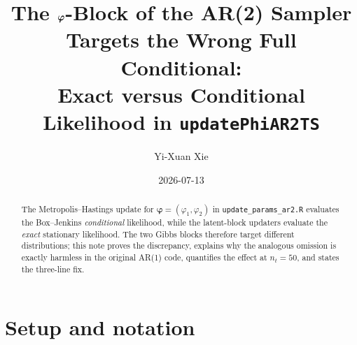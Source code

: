 \documentclass[11pt]{article}
\title{The $\bphi$-Block of the AR(2) Sampler Targets the Wrong Full
       Conditional:\\ Exact versus Conditional Likelihood in
       \texttt{updatePhiAR2TS}}
\author{Yi-Xuan Xie}
\date{2026-07-13}
\newcommand{\bphi}{\boldsymbol{\varphi}}
\theoremstyle{plain}
\theoremstyle{definition}
\theoremstyle{remark}
\begin{document}
\maketitle

\begin{abstract}
\noindent
The Metropolis--Hastings update for $\bphi = (\varphi_1, \varphi_2)$ in
\texttt{update\_params\_ar2.R} evaluates the Box--Jenkins \emph{conditional}
likelihood, while the latent-block updaters evaluate the \emph{exact}
stationary likelihood. The two Gibbs blocks therefore target different
distributions; this note proves the discrepancy, explains why the analogous
omission is exactly harmless in the original AR(1) code, quantifies the effect
at $n_t = 50$, and states the three-line fix.
\end{abstract}

\section{Setup and notation}\label{sec:setup}
\end{document}

